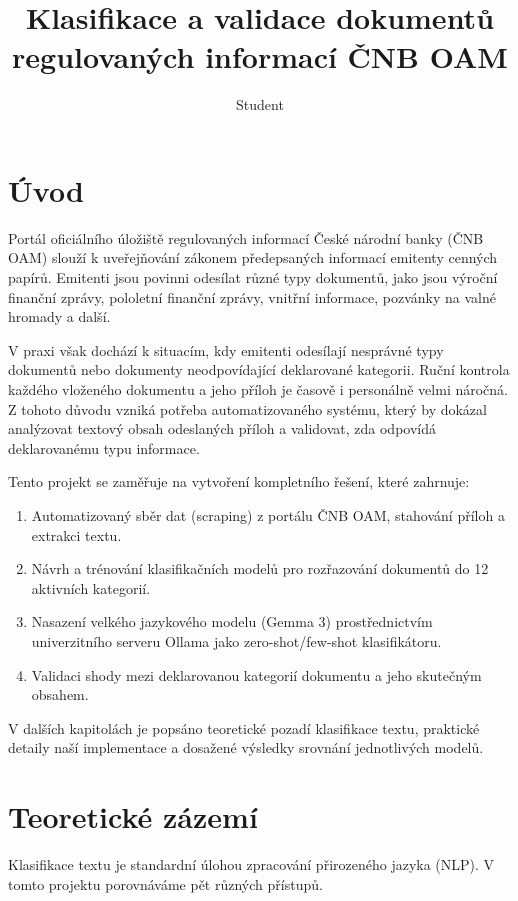 \documentclass[czech, oth, kky, he, iso690alph, pdf, viewonly]{fasthesis}%
\title{Klasifikace a validace dokumentů regulovaných informací ČNB OAM}
\author{Student}{ZČU}{}{}
\begin{document}
\frontpages[notm]
\tableofcontents

\chapter{Úvod}
Portál oficiálního úložiště regulovaných informací České národní banky (ČNB OAM) slouží k uveřejňování zákonem předepsaných informací emitenty cenných papírů. Emitenti jsou povinni odesílat různé typy dokumentů, jako jsou výroční finanční zprávy, pololetní finanční zprávy, vnitřní informace, pozvánky na valné hromady a další. 

V praxi však dochází k situacím, kdy emitenti odesílají nesprávné typy dokumentů nebo dokumenty neodpovídající deklarované kategorii. Ruční kontrola každého vloženého dokumentu a jeho příloh je časově i personálně velmi náročná. Z tohoto důvodu vzniká potřeba automatizovaného systému, který by dokázal analýzovat textový obsah odeslaných příloh a validovat, zda odpovídá deklarovanému typu informace.

Tento projekt se zaměřuje na vytvoření kompletního řešení, které zahrnuje:
\begin{enumerate}
    \item Automatizovaný sběr dat (scraping) z portálu ČNB OAM, stahování příloh a extrakci textu.
    \item Návrh a trénování klasifikačních modelů pro rozřazování dokumentů do 12 aktivních kategorií.
    \item Nasazení velkého jazykového modelu (Gemma 3) prostřednictvím univerzitního serveru Ollama jako zero-shot/few-shot klasifikátoru.
    \item Validaci shody mezi deklarovanou kategorií dokumentu a jeho skutečným obsahem.
\end{enumerate}

V dalších kapitolách je popsáno teoretické pozadí klasifikace textu, praktické detaily naší implementace a dosažené výsledky srovnání jednotlivých modelů.

\chapter{Teoretické zázemí}
Klasifikace textu je standardní úlohou zpracování přirozeného jazyka (NLP). V tomto projektu porovnáváme pět různých přístupů.
\end{document}
